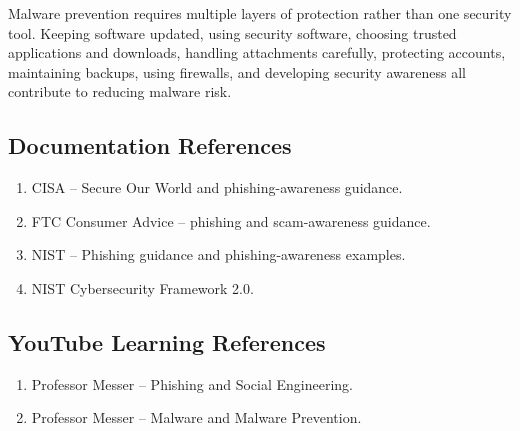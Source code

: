 \documentclass[12pt,a4paper]{article}
\begin{document}
Malware prevention requires multiple layers of protection rather than
one security tool. Keeping software updated, using security software,
choosing trusted applications and downloads, handling attachments
carefully, protecting accounts, maintaining backups, using firewalls,
and developing security awareness all contribute to reducing malware
risk.


\Needspace{5cm}
\subsection{Documentation References}

\begin{enumerate}
    \item CISA -- Secure Our World and phishing-awareness guidance.
    \item FTC Consumer Advice -- phishing and scam-awareness guidance.
    \item NIST -- Phishing guidance and phishing-awareness examples.
    \item NIST Cybersecurity Framework 2.0.
\end{enumerate}

\Needspace{4cm}
\subsection{YouTube Learning References}

\begin{enumerate}
    \item Professor Messer -- Phishing and Social Engineering.
    \item Professor Messer -- Malware and Malware Prevention.
\end{enumerate}
\end{document}
